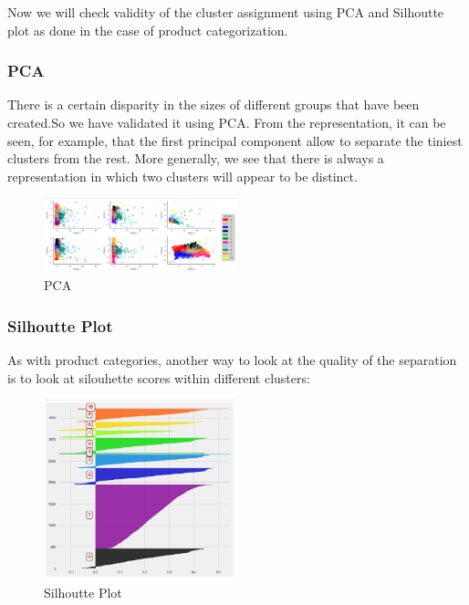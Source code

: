 Now we will check validity of the cluster assignment using PCA and Silhoutte plot as done in the case of product categorization.\\

\subsubsection*{PCA}

There is a certain disparity in the sizes of different groups that have been created.So we have validated it using PCA. From the representation, it can be seen, for example, that the first principal component allow to separate the tiniest clusters from the rest. More generally, we see that there is always a representation in which two clusters will appear to be distinct.\\


\begin{figure}[h]
\caption{PCA}
\label{4.4}
\centering
\includegraphics[width=0.5\textwidth]{images/4_4.PNG}
\end{figure}

\subsubsection*{Silhoutte Plot}

As with product categories, another way to look at the quality of the separation is to look at silouhette scores within different clusters:\\

\begin{figure}[h]
\caption{Silhoutte Plot}
\label{4.5}
\centering
\includegraphics[width=0.5\textwidth]{images/4_5.PNG}
\end{figure}

